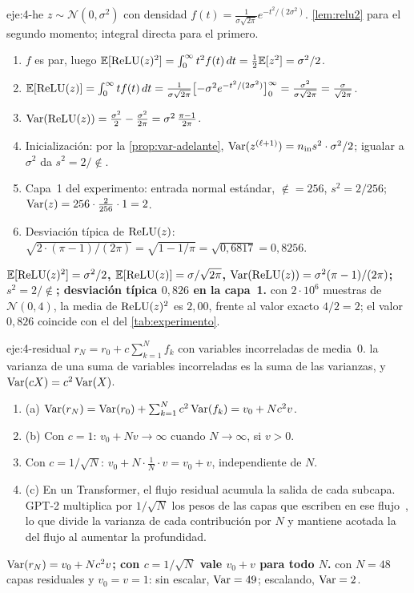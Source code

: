 \begin{solucion}{eje:4-he}
\datos $z\sim\mathcal{N}(0,\sigma^{2})$ con densidad $f(t)=\frac{1}{\sigma\sqrt{2\pi}}e^{-t^{2}/(2\sigma^{2})}$.
\planteamiento \cref{lem:relu2} para el segundo momento; integral directa para el primero.
\pasos
\begin{enumerate}[label=\arabic*.]
  \item $f$ es par, luego $\mathbb{E}[\operatorname{ReLU}(z)^{2}]=\int_0^{\infty}t^{2}f(t)\,dt=\tfrac12\mathbb{E}[z^{2}]=\sigma^{2}/2$.
  \item $\mathbb{E}[\operatorname{ReLU}(z)]=\int_0^{\infty}t f(t)\,dt=\frac{1}{\sigma\sqrt{2\pi}}\bigl[-\sigma^{2}e^{-t^{2}/(2\sigma^{2})}\bigr]_0^{\infty}=\frac{\sigma^{2}}{\sigma\sqrt{2\pi}}=\frac{\sigma}{\sqrt{2\pi}}$.
  \item $\operatorname{Var}(\operatorname{ReLU}(z))=\frac{\sigma^{2}}{2}-\frac{\sigma^{2}}{2\pi}=\sigma^{2}\,\frac{\pi-1}{2\pi}$.
  \item Inicialización: por la \cref{prop:var-adelante}, $\operatorname{Var}(z^{(\ell+1)})=n_{\mathrm{in}} s^{2}\cdot\sigma^{2}/2$; igualar a $\sigma^{2}$ da $s^{2}=2/\nin$.
  \item Capa~1 del experimento: entrada normal estándar, $\nin=256$, $s^{2}=2/256$; $\operatorname{Var}(z)=256\cdot\tfrac{2}{256}\cdot 1=2$.
  \item Desviación típica de $\operatorname{ReLU}(z)$: $\sqrt{2\cdot(\pi-1)/(2\pi)}=\sqrt{1-1/\pi}=\sqrt{0{,}6817}=0{,}8256$.
\end{enumerate}
\resultado \textbf{$\mathbb{E}[\operatorname{ReLU}(z)^{2}]=\sigma^{2}/2$, $\mathbb{E}[\operatorname{ReLU}(z)]=\sigma/\sqrt{2\pi}$, $\operatorname{Var}(\operatorname{ReLU}(z))=\sigma^{2}(\pi-1)/(2\pi)$; $s^{2}=2/\nin$; desviación típica $0{,}826$ en la capa~1.}
\comprobacion con $2\cdot 10^{6}$ muestras de $\mathcal{N}(0,4)$, la media de $\operatorname{ReLU}(z)^{2}$ es $2{,}00$, frente al valor exacto $4/2=2$; el valor $0{,}826$ coincide con el del \cref{tab:experimento}.
\end{solucion}

\begin{solucion}{eje:4-residual}
\datos $r_N=r_0+c\sum_{k=1}^{N}f_k$ con variables incorreladas de media~0.
\planteamiento la varianza de una suma de variables incorreladas es la suma de las varianzas, y $\operatorname{Var}(cX)=c^{2}\operatorname{Var}(X)$.
\pasos
\begin{enumerate}[label=\arabic*.]
  \item (a) $\operatorname{Var}(r_N)=\operatorname{Var}(r_0)+\sum_{k=1}^{N}c^{2}\operatorname{Var}(f_k)=v_0+Nc^{2}v$.
  \item (b) Con $c=1$: $v_0+Nv\to\infty$ cuando $N\to\infty$, si $v>0$.
  \item Con $c=1/\sqrt N$: $v_0+N\cdot\tfrac1N\cdot v=v_0+v$, independiente de $N$.
  \item (c) En un Transformer, el flujo residual acumula la salida de cada subcapa. GPT-2 multiplica por $1/\sqrt{N}$ los pesos de las capas que escriben en ese flujo~\cite[§2.3]{radford2019}, lo que divide la varianza de cada contribución por $N$ y mantiene acotada la del flujo al aumentar la profundidad.
\end{enumerate}
\resultado \textbf{$\operatorname{Var}(r_N)=v_0+Nc^{2}v$; con $c=1/\sqrt N$ vale $v_0+v$ para todo $N$.}
\comprobacion con $N=48$ capas residuales y $v_0=v=1$: sin escalar, $\operatorname{Var}=49$; escalando, $\operatorname{Var}=2$.
\end{solucion}

